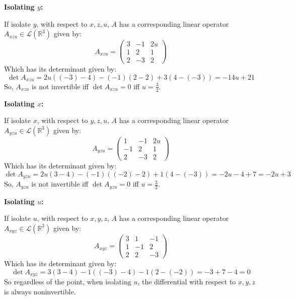 \documentclass{article}
\begin{document}
\hfil

\textbf{Isolating $y$:}

If isolate $y$, with respect to $x,z,u$, $A$ has a corresponding linear operator $A_{xzu}\in\mathcal{L}(\mathbb{R}^3)$ given by:
$$A_{xzu}=\begin{pmatrix}
    3&-1&2u\\
    1&2&1\\
    2&-3&2
\end{pmatrix}$$
Which has its determinant given by:
$$\det A_{xzu} = 2u((-3)-4)-(-1)(2-2)+3(4-(-3))=-14u+21$$
So, $A_{xzu}$ is not invertible iff $\det A_{xzu}=0$ iff $u=\frac{3}{2}$.

\hfil

\textbf{Isolating $x$:}

If isolate $x$, with respect to $y,z,u$, $A$ has a corresponding linear operator $A_{yzu}\in\mathcal{L}(\mathbb{R}^3)$ given by:
$$A_{yzu}=\begin{pmatrix}
    1&-1&2u\\
    -1&2&1\\
    2&-3&2
\end{pmatrix}$$
Which has its determinant given by:
$$\det A_{yzu}=2u(3-4)-(-1)((-2)-2)+1(4-(-3)) = -2u-4+7 = -2u+3$$
So, $A_{yzu}$ is not invertible iff $\det A_{yzu}=0$ iff $u=\frac{3}{2}$.

\hfil

\textbf{Isolating $u$:}

If isolate $u$, with respect to $x,y,z$, $A$ has a corresponding linear operator $A_{xyz}\in\mathcal{L}(\mathbb{R}^3)$ given by:
$$A_{xyz}=\begin{pmatrix}
    3&1&-1\\
    1&-1&2\\
    2&2&-3
\end{pmatrix}$$
Which has its determinant given by:
$$\det A_{xyz}=3(3-4)-1((-3)-4)-1(2-(-2))=-3+7-4 = 0$$
So regardless of the point, when isolating $u$, the differential with respect to $x,y,z$ is always noninvertible.

\hfil

\hfil
\end{document}
